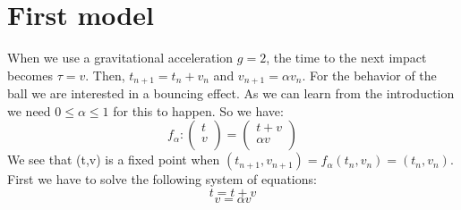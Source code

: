 \documentclass[a4paper]{article}
\begin{document}
\newpage




\section{First model}
When we use a gravitational acceleration $g=2$, the time to the next impact becomes $\tau=v$.
Then, $t_{n+1}=t_n+v_n$ and $v_{n+1}=\alpha v_n$.
For the behavior of the ball we are interested in a bouncing effect.
As we can learn from the introduction we need $0\leq \alpha \leq 1$ for this to happen.
So we have:
\begin{equation}
f_{\alpha}:\begin{pmatrix} 
t\\
v\\
\end{pmatrix}=\begin{pmatrix} 
t+v\\
\alpha v\\
\end{pmatrix}
\end{equation}
\label{sec:examples}
We see that (t,v) is a fixed point when
$(t_{n+1},v_{n+1})=f_\alpha(t_n,v_n)=(t_n,v_n)$.
First we have to solve the following system of equations:
\begin{equation}\label{t=t+v}
t=t+v
\end{equation}
\begin{equation}
v=\alpha v
\end{equation}
\end{document}
